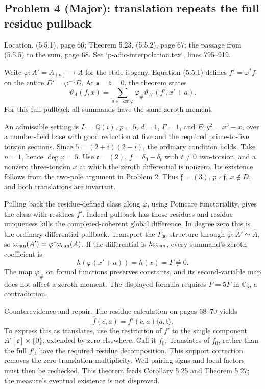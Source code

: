 \documentclass[10pt]{article}
\begin{document}
\subsection*{Problem 4 (Major): translation repeats the full residue pullback}
Location. (5.5.1), page 66; Theorem 5.23, (5.5.2), page 67; the passage from (5.5.5) to the sum, page 68. See `p-adic-interpolation.tex`, lines 795–919.\par
Write \(\varphi:A'=A_{(n)}\to A\) for the etale isogeny. Equation (5.5.1) defines \(f'=\varphi^*f\) on the entire \(D'=\varphi^{-1}D\). At \(\mathfrak s=\mathfrak t=0\), the theorem states \[\vartheta_A(f,x)=\sum_{a\in\ker\varphi}
             \varphi_\#\vartheta_{A'}(f',x'+a).\] For this full pullback all summands have the same zeroth moment.\par
An admissible setting is \(L=\mathbb Q(i)\), \(p=5\), \(d=1\), \(\Gamma=1\), and \(E:y^2=x^3-x\), over a number-field base with good reduction at five and the required prime-to-five torsion sections. Since \(5=(2+i)(2-i)\), the ordinary condition holds. Take \(n=1\), hence \(\deg\varphi=5\). Use \(\mathfrak c=(2)\), \(f=\delta_0-\delta_t\) with \(t\neq0\) two-torsion, and a nonzero three-torsion \(x\) at which the zeroth differential is nonzero. Its existence follows from the two-pole argument in Problem 2. Thus \(\mathfrak f=(3)\), \(p\nmid\mathfrak f\), \(x\notin D\), and both translations are invariant.\par
Pulling back the residue-defined class along \(\varphi\), using Poincare functoriality, gives the class with residues \(f'\). Indeed pullback has those residues and residue uniqueness kills the completed-coherent global difference. In degree zero this is the ordinary differential pullback. Transport the \(\Gamma_{00}\)-structure through \(\widehat\varphi:\widehat A'\simeq\widehat A\), so \(\omega_{\rm can}(A')=\varphi^*\omega_{\rm can}(A)\). If the differential is \(h\omega_{\rm can}\), every summand’s zeroth coefficient is \[h(\varphi(x'+a))=h(x)=F\neq0.\] The map \(\varphi_\#\) on formal functions preserves constants, and its second-variable map does not affect a zeroth moment. The displayed formula requires \(F=5F\) in \(\mathbb C_5\), a contradiction.\par
Counterevidence and repair. The residue calculation on pages 68–70 yields \[\widehat f(c,a)=f'(c,a)\langle a,\mathfrak t\rangle.\] To express this as translates, use the restriction of \(f'\) to the single component \(A'[\mathfrak c]\times\{0\}\), extended by zero elsewhere. Call it \(f_0\). Translates of \(f_0\), rather than the full \(f'\), have the required residue decomposition. This support correction removes the zero-translation multiplicity. Weil-pairing signs and local factors must then be rechecked. This theorem feeds Corollary 5.25 and Theorem 5.27; the measure’s eventual existence is not disproved.\par
\end{document}
